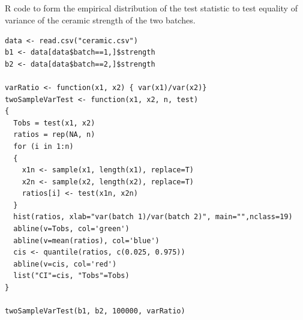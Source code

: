\documentclass[a4paper, 10pt]{article}
\begin{document}
\subsection{ }

R code to form the empirical distribution of the test statistic to test equality of variance of the ceramic strength of the two batches.

\begin{verbatim}
data <- read.csv("ceramic.csv")
b1 <- data[data$batch==1,]$strength
b2 <- data[data$batch==2,]$strength

varRatio <- function(x1, x2) { var(x1)/var(x2)}
twoSampleVarTest <- function(x1, x2, n, test)
{
  Tobs = test(x1, x2)
  ratios = rep(NA, n)
  for (i in 1:n)
  {
    x1n <- sample(x1, length(x1), replace=T)
    x2n <- sample(x2, length(x2), replace=T)
    ratios[i] <- test(x1n, x2n)
  } 
  hist(ratios, xlab="var(batch 1)/var(batch 2)", main="",nclass=19)
  abline(v=Tobs, col='green')
  abline(v=mean(ratios), col='blue')
  cis <- quantile(ratios, c(0.025, 0.975))  
  abline(v=cis, col='red')
  list("CI"=cis, "Tobs"=Tobs)
}

twoSampleVarTest(b1, b2, 100000, varRatio)

\end{verbatim}
\label{S:A1}
\end{document}
